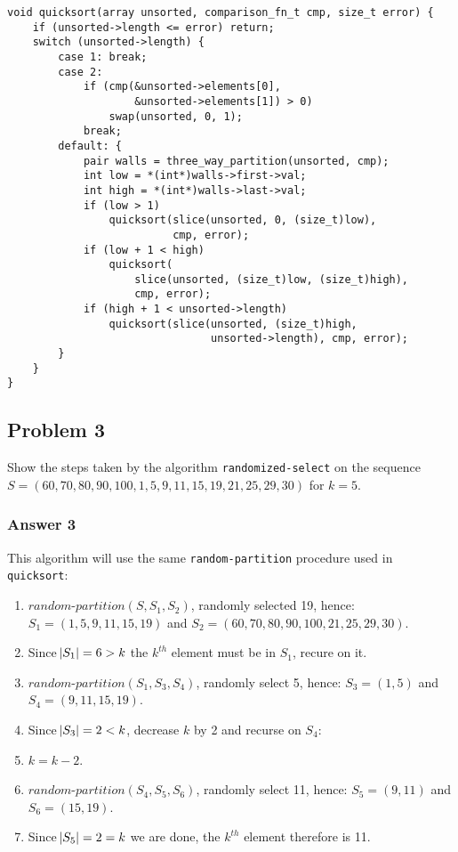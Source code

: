 \documentclass[11pt]{article}
\begin{document}
\lstset{language=C,label= ,caption= ,numbers=none}
\begin{lstlisting}
void quicksort(array unsorted, comparison_fn_t cmp, size_t error) {
    if (unsorted->length <= error) return;
    switch (unsorted->length) {
        case 1: break;
        case 2:
            if (cmp(&unsorted->elements[0],
                    &unsorted->elements[1]) > 0)
                swap(unsorted, 0, 1);
            break;
        default: {
            pair walls = three_way_partition(unsorted, cmp);
            int low = *(int*)walls->first->val;
            int high = *(int*)walls->last->val;
            if (low > 1)
                quicksort(slice(unsorted, 0, (size_t)low),
                          cmp, error);
            if (low + 1 < high)
                quicksort(
                    slice(unsorted, (size_t)low, (size_t)high),
                    cmp, error);
            if (high + 1 < unsorted->length)
                quicksort(slice(unsorted, (size_t)high,
                                unsorted->length), cmp, error);
        }
    }
}
\end{lstlisting}

\subsection{Problem 3}
\label{sec-1-3}
Show the steps taken by the algorithm \texttt{randomized-select} on the sequence
$S = (60, 70, 80, 90, 100, 1, 5, 9, 11, 15, 19, 21, 25, 29, 30)$ for $k = 5$.

\subsubsection{Answer 3}
\label{sec-1-3-1}
This algorithm will use the same \texttt{random-partition} procedure used in
\texttt{quicksort}:
\begin{enumerate}
\item $\textit{random-partition}(S, S_1, S_2)$, randomly selected 19, hence:
$S_1 = (1, 5, 9, 11, 15, 19)$ and 
$S_2 = (60, 70, 80, 90, 100, 21, 25, 29, 30)$.
\item Since $\abs{S_1} = 6 > k$ the $k^{th}$ element must be in $S_1$, recure
on it.
\item $\textit{random-partition}(S_1, S_3, S_4)$, randomly select 5, hence:
$S_3 = (1, 5)$ and
$S_4 = (9, 11, 15, 19)$.
\item Since $\abs{S_3} = 2 < k$, decrease $k$ by 2 and recurse on $S_4$:
\item $k = k - 2$.
\item $\textit{random-partition}(S_4, S_5, S_6)$, randomly select 11, hence:
$S_5 = (9, 11)$ and
$S_6 = (15, 19)$.
\item Since $\abs{S_5} = 2 = k$ we are done, the $k^{th}$ element therefore
is 11.
\end{enumerate}
\end{document}
